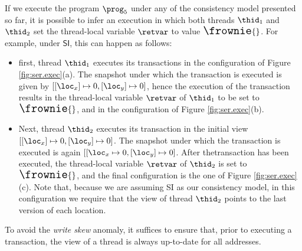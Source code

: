 

If we execute the program $\prog_5$ under any of the consistency model presented so far, it is possible to infer 
an execution in which both threads $\thid_1$ and $\thid_2$ set the 
thread-local variable $\retvar$ to value ${\Large \frownie{}}$.
For example, under $\mathsf{SI}$, this can happen as follows: 
\begin{itemize}
\item first, thread $\thid_1$ executes its transactions in the 
configuration of Figure \ref{fig:ser.exec}(a). The snapshot 
under which the transaction is executed is given by $[[\loc_x] \mapsto 0, [\loc_y] \mapsto 0]$, 
hence the execution of the transaction results in the thread-local variable $\retvar$ of $\thid_1$ 
to be set to ${\Large \frownie{}}$, and in the configuration of Figure \ref{fig:ser.exec}(b).
\item Next, thread $\thid_2$ executes its transaction in the initial 
view $[ [\loc_x] \mapsto 0, [\loc_y] \mapsto 0]$. The snapshot under which 
the transaction is executed is again $[[\loc_x \mapsto 0, [\loc_y] \mapsto 0]$. After 
thetransaction has been executed, the thread-local variable $\retvar$ of $\thid_2$ is 
set to ${\Large \frownie{}}$, and the final configuration is the one of Figure \ref{fig:ser.exec}(c). 
Note that, because we are assuming SI as our consistency model, in this configuration 
we require that the view of thread $\thid_2$ points to the last version of each location.
\end{itemize}


To avoid the \emph{write skew} anomaly, it suffices to ensure that, prior to executing a transaction, the view of a thread is always up-to-date for all addresses. 
